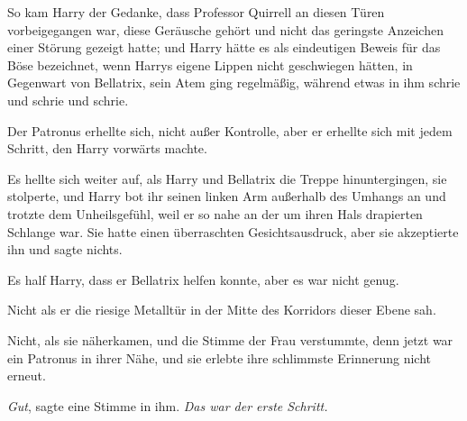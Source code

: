 So kam Harry der Gedanke, dass Professor Quirrell an diesen Türen vorbeigegangen war, diese Geräusche gehört und nicht das geringste Anzeichen einer Störung gezeigt hatte; und Harry hätte es als eindeutigen Beweis für das Böse bezeichnet, wenn Harrys eigene Lippen nicht geschwiegen hätten, in Gegenwart von Bellatrix, sein Atem ging regelmäßig, während etwas in ihm schrie und schrie und schrie.

Der Patronus erhellte sich, nicht außer Kontrolle, aber er erhellte sich mit jedem Schritt, den Harry vorwärts machte.

Es hellte sich weiter auf, als Harry und Bellatrix die Treppe hinuntergingen, sie stolperte, und Harry bot ihr seinen linken Arm außerhalb des Umhangs an und trotzte dem Unheilsgefühl, weil er so nahe an der um ihren Hals drapierten Schlange war. Sie hatte einen überraschten Gesichtsausdruck, aber sie akzeptierte ihn und sagte nichts.

Es half Harry, dass er Bellatrix helfen konnte, aber es war nicht genug.

Nicht als er die riesige Metalltür in der Mitte des Korridors dieser Ebene sah.

Nicht, als sie näherkamen, und die Stimme der Frau verstummte, denn jetzt war ein Patronus in ihrer Nähe, und sie erlebte ihre schlimmste Erinnerung nicht erneut.

\emph{Gut}, sagte eine Stimme in ihm. \emph{Das war der erste Schritt.}

